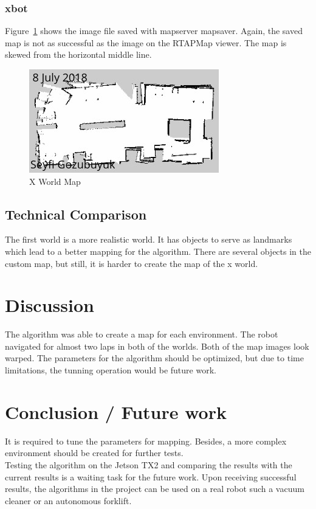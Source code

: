 \documentclass[10pt,journal,compsoc]{IEEEtran}
\begin{document}
\subsubsection{xbot}
Figure~\ref{fig:mapx} shows the image file saved with map\textunderscore server map\textunderscore saver. Again, the saved map is not as successful as the image on the RTAPMap viewer. The map is skewed from the horizontal middle line.

\begin{figure}[thpb]
      \centering
      \includegraphics[width=\linewidth]{figures/map_x.png}
      \caption{X World Map}
      \label{fig:mapx}
\end{figure}

\subsection{Technical Comparison} %
The first world is a more realistic world. It has objects to serve as landmarks which lead to a better mapping for the algorithm. There are several objects in the custom map, but still, it is harder to create the map of the x world.

\section{Discussion}
The algorithm was able to create a map for each environment. The robot navigated for almost two laps in both of the worlds. Both of the map images look warped. The parameters for the algorithm should be optimized, but due to time limitations, the tunning operation would be future work.

\section{Conclusion / Future work}
It is required to tune the parameters for mapping. Besides, a more complex environment should be created for further tests.
\\
Testing the algorithm on the Jetson TX2 and comparing the results with the current results is a waiting task for the future work. Upon receiving successful results, the algorithms in the project can be used on a real robot such a vacuum cleaner or an autonomous forklift.
\end{document}
